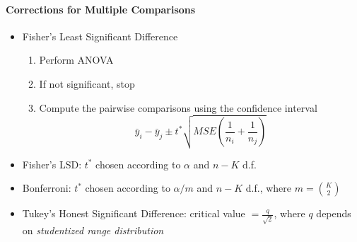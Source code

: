 \documentclass[10pt]{article}\usepackage[]{graphicx}\usepackage[]{color}
\begin{document}
\paragraph{Corrections for Multiple Comparisons}
	\begin{itemize}
		\item Fisher's Least Significant Difference
		\begin{enumerate}
			\item Perform ANOVA
			\item If not significant, stop
			\item Compute the pairwise comparisons using the confidence interval
			$$
				\bar{y}_i - \bar{y}_j \pm t^* \sqrt{MSE \left( \frac{1}{n_i} + \frac{1}{n_j} \right) }
			$$	
		\end{enumerate}
		\item Fisher's LSD: $t^*$ chosen according to $\alpha$ and $n-K$ d.f.
		\item Bonferroni: $t^*$ chosen according to $\alpha/m$ and $n-K$ d.f., where $m = \binom{K}{2}$
		\item Tukey's Honest Significant Difference: critical value $=\frac{q}{\sqrt{2}}$, where $q$ depends on \emph{studentized range distribution}
	\end{itemize}
\end{document}
